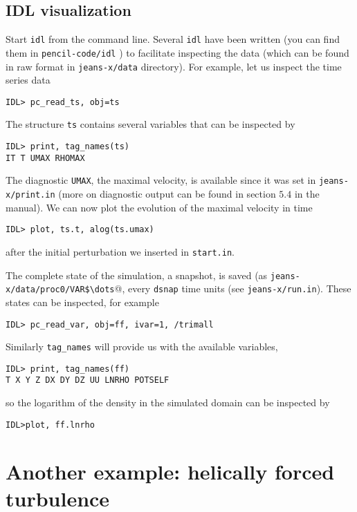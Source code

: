 \documentclass[a4paper,12pt]{article}
\begin{document}
\subsection{IDL visualization}

Start \verb|idl| from the command line. Several \verb|idl| have been written
(you can find them in \verb|pencil-code/idl| ) to facilitate inspecting the data
(which can be found in raw format in \verb|jeans-x/data| directory).  For
example, let us inspect the time series data
\begin{verbatim}
IDL> pc_read_ts, obj=ts
\end{verbatim}
The structure \verb|ts| contains several variables that can be inspected by
\begin{verbatim}
IDL> print, tag_names(ts)
IT T UMAX RHOMAX
\end{verbatim}
The diagnostic \verb|UMAX|, the maximal velocity, is available since it was set
in \verb|jeans-x/print.in| (more on diagnostic output can be found in section
$5.4$ in the manual).  We can now plot the evolution of the maximal velocity in
time
\begin{verbatim}
IDL> plot, ts.t, alog(ts.umax)
\end{verbatim}
after the initial perturbation we inserted in \verb|start.in|.

The complete state of the simulation, a snapshot, is saved (as
\verb|jeans-x/data/proc0/VAR$\dots|@, every \verb|dsnap|
time units
(see \verb|jeans-x/run.in|). These states can be inspected, for example
\begin{verbatim}
IDL> pc_read_var, obj=ff, ivar=1, /trimall
\end{verbatim}
Similarly \verb|tag_names| will provide us with the available variables, 
\begin{verbatim}
IDL> print, tag_names(ff)
T X Y Z DX DY DZ UU LNRHO POTSELF
\end{verbatim}
so the logarithm of the density in the simulated domain can be inspected by
\begin{verbatim}
IDL>plot, ff.lnrho
\end{verbatim}


\section{Another example: helically forced turbulence}


\end{document}
